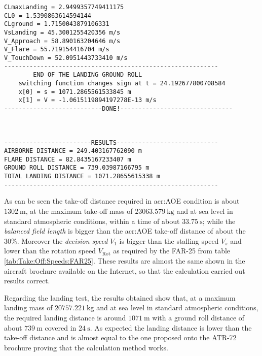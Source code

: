 \bigskip
\begin{lstlisting}[caption={ATR-72 landing test results}, captionpos=b, tabsize=2]
CLmaxLanding = 2.9499357749411175
CL0 = 1.5390863614594144
CLground = 1.7150043879106331
VsLanding = 45.3001255420356 m/s
V_Approach = 58.890163204646 m/s
V_Flare = 55.719154416704 m/s
V_TouchDown = 52.0951443733410 m/s
-----------------------------------------------------------
		END OF THE LANDING GROUND ROLL
	switching function changes sign at t = 24.192677800708584
	x[0] = s = 1071.2865561533845 m
	x[1] = V = -1.0615119894197278E-13 m/s
---------------------------DONE!-------------------------------



------------------------RESULTS----------------------------
AIRBORNE DISTANCE = 249.403167762090 m
FLARE DISTANCE = 82.8435167233407 m
GROUND ROLL DISTANCE = 739.03987166795 m
TOTAL LANDING DISTANCE = 1071.28655615338 m
-----------------------------------------------------------
\end{lstlisting}
%
As can be seen the take-off distance required in \gls{acr:AOE} condition is about $\SI{1302}{\meter}$, at the maximum take-off mass of $\SI{23063.579}{\kilogram}$ and at sea level in standard atmospheric conditions, within a time of about $\SI{33.75}{\second}$; while the \emph{balanced field length} is bigger than the \gls{acr:AOE} take-off distance of about the 30\%. Moreover the \emph{decision speed} $V_1$ is bigger than the stalling speed $V_s$ and lower than the rotation speed $V_{\text{Rot}}$ as required by the \gls{FAR}-25 from table \ref{tab:Take:Off:Speeds:FAR25}. These results are almost the same shown in the aircraft brochure available on the Internet, so that the calculation carried out results correct.

\bigskip
\noindent
Regarding the landing test, the results obtained show that, at a maximum landing mass of $\SI{20757.221}{\kilogram}$ and at sea level in standard atmospheric conditions, the required landing distance is around $\SI{1071}{\meter}$ with a ground roll distance of about $\SI{739}{\meter}$ covered in $\SI{24}{\second}$. As expected the landing distance is lower than the take-off distance and is almost equal to the one proposed onto the ATR-72 brochure proving that the calculation method works.

